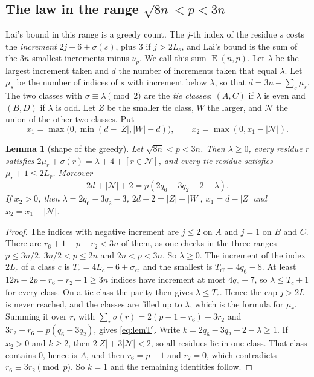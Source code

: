 \documentclass[11pt]{amsart}
\newtheorem{lemma}[theorem]{Lemma}
\theoremstyle{definition}
\theoremstyle{remark}
\numberwithin{equation}{section}
\newcommand{\Lex}{\operatorname{E}}
\begin{document}
\subsection{The law in the range \texorpdfstring{$\sqrt{8n}<p<3n$}{sqrt(8n) < p < 3n}}
Lai's bound in this range \cite[Lemma~4.4]{Lai2026} is a greedy count. The $j$-th index of the residue $s$ costs the
\emph{increment} $2j-6+\sigma(s)$, plus $3$ if $j>2L_s$, and Lai's bound is the sum of the $3n$ smallest increments
minus $\nu_p$. We call this sum $\Lex(n,p)$. Let $\lambda$ be the largest increment taken and $d$ the number of
increments taken that equal $\lambda$. Let $\mu_s$ be the number of indices of $s$ with increment below $\lambda$, so
that $d=3n-\sum_s\mu_s$. The two classes with $\sigma\equiv\lambda\pmod2$ are the \emph{tie classes}: $(A,C)$ if $\lambda$
is even and $(B,D)$ if $\lambda$ is odd. Let $Z$ be the smaller tie class, $W$ the larger, and $\mathcal N$ the union
of the other two classes. Put
\[
 x_1=\max\bigl(0,\min(d-|Z|,|W|-d)\bigr),\qquad x_2=\max(0,x_1-|\mathcal N|).
\]

\begin{lemma}[shape of the greedy]\label{lem:S}
Let $\sqrt{8n}<p<3n$. Then $\lambda\ge0$, every residue $r$ satisfies $2\mu_r+\sigma(r)=\lambda+4+[r\in\mathcal N]$, and
every tie residue satisfies $\mu_r+1\le2L_r$. Moreover
\begin{equation}\label{eq:lemT}
 2d+|\mathcal N|+2=p(2q_6-3q_2-2-\lambda).
\end{equation}
If $x_2>0$, then $\lambda=2q_6-3q_2-3$, $2d+2=|Z|+|W|$, $x_1=d-|Z|$ and $x_2=x_1-|\mathcal N|$.
\end{lemma}

\begin{proof}
The indices with negative increment are $j\le2$ on $A$ and $j=1$ on $B$ and $C$. There are $r_6+1+p-r_2<3n$ of
them, as one checks in the three ranges $p\le3n/2$, $3n/2<p\le2n$ and $2n<p<3n$. So $\lambda\ge0$. The increment of the
index $2L_c$ of a class $c$ is $T_c=4L_c-6+\sigma_c$, and the smallest is $T_C=4q_6-8$. At least
$12n-2p-r_6-r_2+1\ge3n$ indices have increment at most $4q_6-7$, so $\lambda\le T_c+1$ for every class. On a tie class
the parity then gives $\lambda\le T_c$. Hence the cap $j>2L$ is never reached, and the classes are filled up to
$\lambda$, which is the formula for $\mu_r$. Summing it over $r$, with
$\sum_r\sigma(r)=2(p-1-r_6)+3r_2$ and $3r_2-r_6=p(q_6-3q_2)$, gives \eqref{eq:lemT}. Write
$k=2q_6-3q_2-2-\lambda\ge1$. If $x_2>0$ and $k\ge2$, then $2|Z|+3|\mathcal N|<2$, so all residues lie in one class.
That class contains $0$, hence is $A$, and then $r_6=p-1$ and $r_2=0$, which contradicts $r_6\equiv3r_2\pmod p$. So $k=1$
and the remaining identities follow.
\end{proof}
\end{document}
